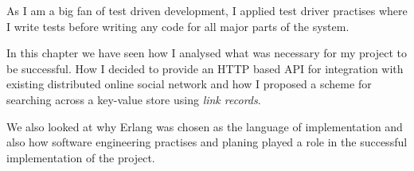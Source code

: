As I am a big fan of test driven development, I applied test driver practises where I write tests before writing any code for all major parts of the system.

\mbox{}

In this chapter we have seen how I analysed what was necessary for my project to be successful. How I decided to provide an HTTP based API for integration with existing distributed online social network and how I proposed a scheme for searching across a key-value store using \emph{link records}.

We also looked at why Erlang was chosen as the language of implementation and also how software engineering practises and planing played a role in the successful implementation of the project.
